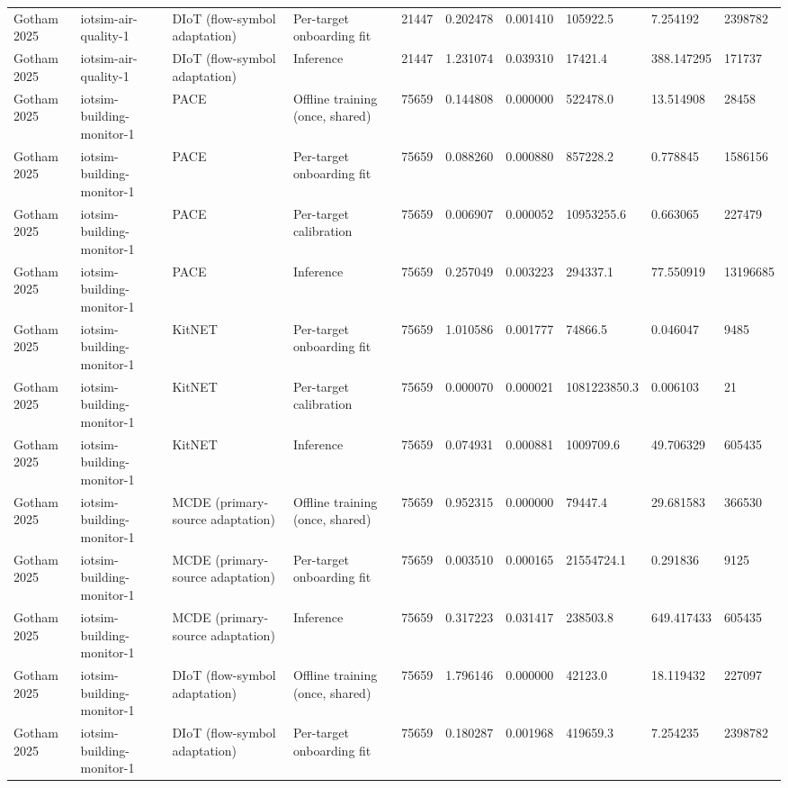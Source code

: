\begin{tabular}{llllllllll}
Gotham 2025 & iotsim-air-quality-1 & DIoT (flow-symbol adaptation) & Per-target onboarding fit & 21447 & 0.202478 & 0.001410 & 105922.5 & 7.254192 & 2398782 \\
Gotham 2025 & iotsim-air-quality-1 & DIoT (flow-symbol adaptation) & Inference & 21447 & 1.231074 & 0.039310 & 17421.4 & 388.147295 & 171737 \\
Gotham 2025 & iotsim-building-monitor-1 & PACE & Offline training (once, shared) & 75659 & 0.144808 & 0.000000 & 522478.0 & 13.514908 & 28458 \\
Gotham 2025 & iotsim-building-monitor-1 & PACE & Per-target onboarding fit & 75659 & 0.088260 & 0.000880 & 857228.2 & 0.778845 & 1586156 \\
Gotham 2025 & iotsim-building-monitor-1 & PACE & Per-target calibration & 75659 & 0.006907 & 0.000052 & 10953255.6 & 0.663065 & 227479 \\
Gotham 2025 & iotsim-building-monitor-1 & PACE & Inference & 75659 & 0.257049 & 0.003223 & 294337.1 & 77.550919 & 13196685 \\
Gotham 2025 & iotsim-building-monitor-1 & KitNET & Per-target onboarding fit & 75659 & 1.010586 & 0.001777 & 74866.5 & 0.046047 & 9485 \\
Gotham 2025 & iotsim-building-monitor-1 & KitNET & Per-target calibration & 75659 & 0.000070 & 0.000021 & 1081223850.3 & 0.006103 & 21 \\
Gotham 2025 & iotsim-building-monitor-1 & KitNET & Inference & 75659 & 0.074931 & 0.000881 & 1009709.6 & 49.706329 & 605435 \\
Gotham 2025 & iotsim-building-monitor-1 & MCDE (primary-source adaptation) & Offline training (once, shared) & 75659 & 0.952315 & 0.000000 & 79447.4 & 29.681583 & 366530 \\
Gotham 2025 & iotsim-building-monitor-1 & MCDE (primary-source adaptation) & Per-target onboarding fit & 75659 & 0.003510 & 0.000165 & 21554724.1 & 0.291836 & 9125 \\
Gotham 2025 & iotsim-building-monitor-1 & MCDE (primary-source adaptation) & Inference & 75659 & 0.317223 & 0.031417 & 238503.8 & 649.417433 & 605435 \\
Gotham 2025 & iotsim-building-monitor-1 & DIoT (flow-symbol adaptation) & Offline training (once, shared) & 75659 & 1.796146 & 0.000000 & 42123.0 & 18.119432 & 227097 \\
Gotham 2025 & iotsim-building-monitor-1 & DIoT (flow-symbol adaptation) & Per-target onboarding fit & 75659 & 0.180287 & 0.001968 & 419659.3 & 7.254235 & 2398782 \\

\end{tabular}
